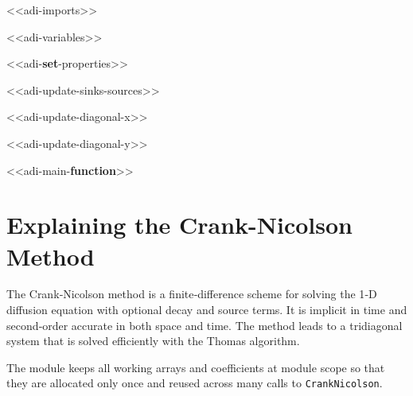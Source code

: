 \documentclass[
  letterpaper,
  DIV=11,
  numbers=noendperiod]{scrreprt}
\newenvironment{Shaded}{\begin{snugshade}}{\end{snugshade}}
\newcommand{\KeywordTok}[1]{\textcolor[rgb]{0.00,0.23,0.31}{\textbf{#1}}}
\newcommand{\NormalTok}[1]{\textcolor[rgb]{0.00,0.23,0.31}{#1}}
\newcommand{\OperatorTok}[1]{\textcolor[rgb]{0.37,0.37,0.37}{#1}}
\begin{document}
\begin{Shaded}
\begin{Highlighting}[]
\OperatorTok{\textless{}\textless{}}\NormalTok{adi}\OperatorTok{{-}}\NormalTok{imports}\OperatorTok{\textgreater{}\textgreater{}}

\OperatorTok{\textless{}\textless{}}\NormalTok{adi}\OperatorTok{{-}}\NormalTok{variables}\OperatorTok{\textgreater{}\textgreater{}}

\OperatorTok{\textless{}\textless{}}\NormalTok{adi}\OperatorTok{{-}}\KeywordTok{set}\OperatorTok{{-}}\NormalTok{properties}\OperatorTok{\textgreater{}\textgreater{}}

\OperatorTok{\textless{}\textless{}}\NormalTok{adi}\OperatorTok{{-}}\NormalTok{update}\OperatorTok{{-}}\NormalTok{sinks}\OperatorTok{{-}}\NormalTok{sources}\OperatorTok{\textgreater{}\textgreater{}}

\OperatorTok{\textless{}\textless{}}\NormalTok{adi}\OperatorTok{{-}}\NormalTok{update}\OperatorTok{{-}}\NormalTok{diagonal}\OperatorTok{{-}}\NormalTok{x}\OperatorTok{\textgreater{}\textgreater{}}

\OperatorTok{\textless{}\textless{}}\NormalTok{adi}\OperatorTok{{-}}\NormalTok{update}\OperatorTok{{-}}\NormalTok{diagonal}\OperatorTok{{-}}\NormalTok{y}\OperatorTok{\textgreater{}\textgreater{}}

\OperatorTok{\textless{}\textless{}}\NormalTok{adi}\OperatorTok{{-}}\NormalTok{main}\OperatorTok{{-}}\KeywordTok{function}\OperatorTok{\textgreater{}\textgreater{}}
\end{Highlighting}
\end{Shaded}


\chapter{Explaining the Crank-Nicolson
Method}\label{explaining-the-crank-nicolson-method}

The Crank‑Nicolson method is a finite‑difference scheme for solving the
1‑D diffusion equation with optional decay and source terms. It is
implicit in time and second‑order accurate in both space and time. The
method leads to a tridiagonal system that is solved efficiently with the
Thomas algorithm.

The module keeps all working arrays and coefficients at module scope so
that they are allocated only once and reused across many calls to
\texttt{CrankNicolson}.
\end{document}
